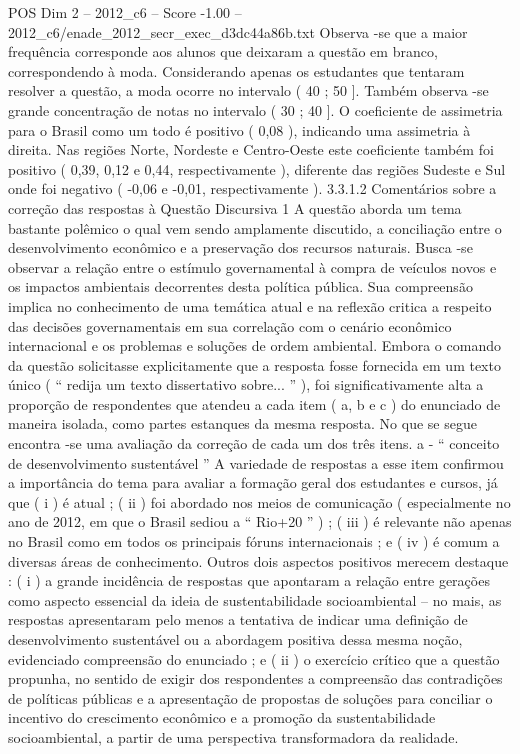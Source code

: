 \begin{textsample}{POS Dim 2 – 2012\_c6 – Score -1.00 – 2012\_c6/enade\_2012\_secr\_exec\_d3dc44a86b.txt}
Observa -se que a maior frequência corresponde aos alunos que deixaram a questão em branco, correspondendo à moda.
Considerando apenas os estudantes que tentaram resolver a questão, a moda ocorre no intervalo ( 40 ; 50 ].
Também observa -se grande concentração de notas no intervalo ( 30 ; 40 ].
O coeficiente de assimetria para o Brasil como um todo é positivo ( 0,08 ), indicando uma assimetria à direita.
Nas regiões Norte, Nordeste e Centro-Oeste este coeficiente também foi positivo ( 0,39, 0,12 e 0,44, respectivamente ), diferente das regiões Sudeste e Sul onde foi negativo ( -0,06 e -0,01, respectivamente ). 3.3.1.2 Comentários sobre a correção das respostas à Questão Discursiva 1 A questão aborda um tema bastante polêmico o qual vem sendo amplamente discutido, a conciliação entre o desenvolvimento econômico e a preservação dos recursos naturais.
Busca -se observar a relação entre o estímulo governamental à compra de veículos novos e os impactos ambientais decorrentes desta política pública.
Sua compreensão implica no conhecimento de uma temática atual e na reflexão critica a respeito das decisões governamentais em sua correlação com o cenário econômico internacional e os problemas e soluções de ordem ambiental.
Embora o comando da questão solicitasse explicitamente que a resposta fosse fornecida em um texto único ( “ redija um texto dissertativo sobre... ” ), foi significativamente alta a proporção de respondentes que atendeu a cada item ( a, b e c ) do enunciado de maneira isolada, como partes estanques da mesma resposta.
No que se segue encontra -se uma avaliação da correção de cada um dos três itens. a - “ conceito de desenvolvimento sustentável ” A variedade de respostas a esse item confirmou a importância do tema para avaliar a formação geral dos estudantes e cursos, já que ( i ) é atual ; ( ii ) foi abordado nos meios de comunicação ( especialmente no ano de 2012, em que o Brasil sediou a “ Rio+20 ” ) ; ( iii ) é relevante não apenas no Brasil como em todos os principais fóruns internacionais ; e ( iv ) é comum a diversas áreas de conhecimento.
Outros dois aspectos positivos merecem destaque : ( i ) a grande incidência de respostas que apontaram a relação entre gerações como aspecto essencial da ideia de sustentabilidade socioambiental – no mais, as respostas apresentaram pelo menos a tentativa de indicar uma definição de desenvolvimento sustentável ou a abordagem positiva dessa mesma noção, evidenciado compreensão do enunciado ; e ( ii ) o exercício crítico que a questão propunha, no sentido de exigir dos respondentes a compreensão das contradições de políticas públicas e a apresentação de propostas de soluções para conciliar o incentivo do crescimento econômico e a promoção da sustentabilidade socioambiental, a partir de uma perspectiva transformadora da realidade.

\end{textsample}
